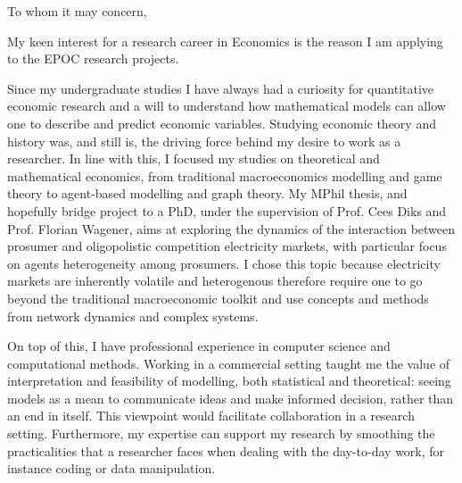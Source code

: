 \documentclass{letter}
\begin{document}
\begin{letter}{}

    \begin{adjustwidth}{-30pt}{-30pt}
        \opening{To whom it may concern,}


        My keen interest for a research career in Economics is the reason I am applying to the EPOC research projects.

        Since my undergraduate studies I have always had a curiosity for quantitative economic research and a will to understand how mathematical models can allow one to describe and predict economic variables. Studying economic theory and history was, and still is, the driving force behind my desire to work as a researcher. In line with this, I focused my studies on theoretical and mathematical economics, from traditional macroeconomics modelling and game theory to agent-based modelling and graph theory. My MPhil thesis, and hopefully bridge project to a PhD, under the supervision of Prof. Cees Diks and Prof. Florian Wagener, aims at exploring the dynamics of the interaction between prosumer and oligopolistic competition electricity markets, with particular focus on agents heterogeneity among prosumers. I chose this topic because electricity markets are inherently volatile and heterogenous therefore require one to go beyond the traditional macroeconomic toolkit and use concepts and methods from network dynamics and complex systems.

        On top of this, I have professional experience in computer science and computational methods. Working in a commercial setting taught me the value of interpretation and feasibility of modelling, both statistical and theoretical: seeing models as a mean to communicate ideas and make informed decision, rather than an end in itself. This viewpoint would facilitate collaboration in a research setting. Furthermore, my expertise can support my research by smoothing the practicalities that a researcher faces when dealing with the day-to-day work, for instance coding or data manipulation.



\end{adjustwidth}
\end{letter}
\end{document}
